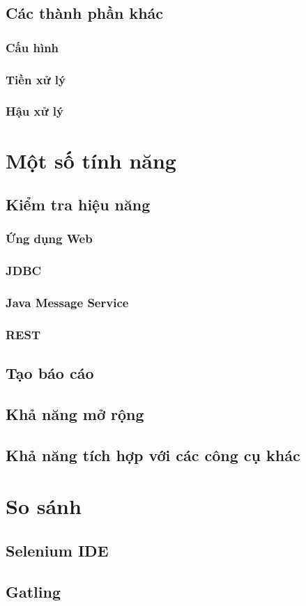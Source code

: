 \documentclass[10pt]{report}
\begin{document}
\section{Các thành phần khác}

\subsection{Cấu hình}
\subsection{Tiền xử lý}
\subsection{Hậu xử lý}

\chapter{Một số tính năng}

\section{Kiểm tra hiệu năng}

\subsection{Ứng dụng Web}

\subsection{JDBC}

\subsection{Java Message Service}

\subsection{REST}

\section{Tạo báo cáo}

\section{Khả năng mở rộng}

\section{Khả năng tích hợp với các công cụ khác}

\chapter{So sánh}

\section{Selenium IDE}

\section{Gatling}
\end{document}
